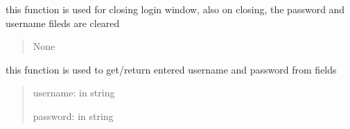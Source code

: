 \documentclass[letterpaper,10pt,english]{sphinxmanual}
\begin{document}
\begin{savenotes}
\begin{fulllineitems}
\begin{savenotes}
\begin{fulllineitems}
\end{fulllineitems}\end{savenotes}


\begin{savenotes}\begin{fulllineitems}
\label{\detokenize{setting/login_UI:oxin.login_UI.UI_main_window.close_win}}
\pysigstartsignatures
{}
\pysigstopsignatures
\sphinxAtStartPar
this function is used for closing login window, also on closing, the password and username fileds are cleared
\begin{quote}\begin{description}
\sphinxAtStartPar
None

\end{description}\end{quote}

\end{fulllineitems}\end{savenotes}


\begin{savenotes}\begin{fulllineitems}
\label{\detokenize{setting/login_UI:oxin.login_UI.UI_main_window.get_user_pass}}
\pysigstartsignatures
{}
\pysigstopsignatures
\sphinxAtStartPar
this function is used to get/return entered username and password from fields
\begin{quote}\begin{description}
\sphinxAtStartPar
username: in string

\sphinxAtStartPar
password: in string

\end{description}\end{quote}

\end{fulllineitems}\end{savenotes}



\end{fulllineitems}
\end{savenotes}
\end{document}
